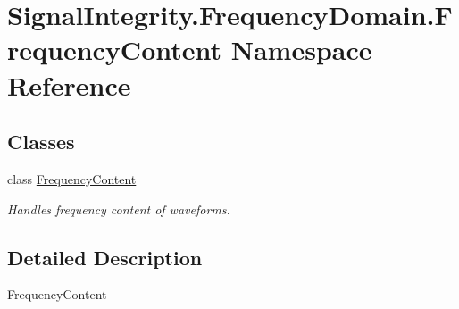 \hypertarget{namespaceSignalIntegrity_1_1FrequencyDomain_1_1FrequencyContent}{}\section{Signal\+Integrity.\+Frequency\+Domain.\+Frequency\+Content Namespace Reference}
\label{namespaceSignalIntegrity_1_1FrequencyDomain_1_1FrequencyContent}
\subsection*{Classes}
\begin{DoxyCompactItemize}
\item 
class \hyperlink{classSignalIntegrity_1_1FrequencyDomain_1_1FrequencyContent_1_1FrequencyContent}{Frequency\+Content}
\begin{DoxyCompactList}\small\item\em Handles frequency content of waveforms. \end{DoxyCompactList}\end{DoxyCompactItemize}


\subsection{Detailed Description}
\begin{DoxyVerb}FrequencyContent\end{DoxyVerb}
 